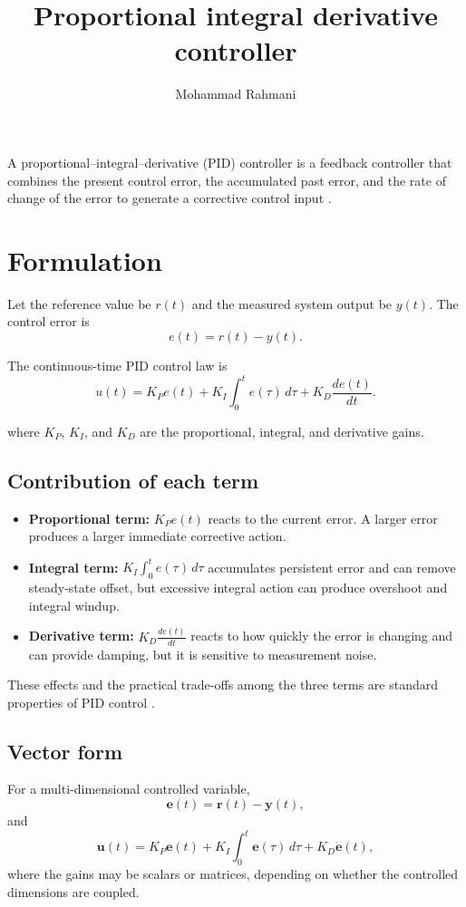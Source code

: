 \documentclass[a4paper]{article}
\title{Proportional integral derivative controller}
\date{}
\author{Mohammad Rahmani}
\begin{document}
   \maketitle

   A proportional--integral--derivative (PID) controller is a feedback controller that combines the present control error, the accumulated past error, and the rate of change of the error to generate a corrective control input \cite{astrom-2008-feedback-systems-an-introduction-for-scientists-and-engineers}.

   \section{Formulation}
      Let the reference value be $r(t)$ and the measured system output be $y(t)$. The control error is
      \[
         e(t)=r(t)-y(t).
      \]

      The continuous-time PID control law is
      \[
         u(t)
         =
         K_P e(t)
         +
         K_I \int_{0}^{t} e(\tau)\,d\tau
         +
         K_D \frac{de(t)}{dt}.
      \]

      where $K_P$, $K_I$, and $K_D$ are the proportional, integral, and derivative gains.

   \subsection{Contribution of each term}
      \begin{itemize}
         \item \textbf{Proportional term:} $K_P e(t)$ reacts to the current error. A larger error produces a larger immediate corrective action.
         \item \textbf{Integral term:} $K_I \int_0^t e(\tau)\,d\tau$ accumulates persistent error and can remove steady-state offset, but excessive integral action can produce overshoot and integral windup.
         \item \textbf{Derivative term:} $K_D \frac{de(t)}{dt}$ reacts to how quickly the error is changing and can provide damping, but it is sensitive to measurement noise.
      \end{itemize}
      These effects and the practical trade-offs among the three terms are standard properties of PID control \cite{astrom-2008-feedback-systems-an-introduction-for-scientists-and-engineers}.

   \subsection{Vector form}
      For a multi-dimensional controlled variable,
      \[
         \mathbf{e}(t)
         =
         \mathbf{r}(t)-\mathbf{y}(t),
      \]
      and
      \[
         \mathbf{u}(t)
         =
         K_P\mathbf{e}(t)
         +
         K_I\int_0^t\mathbf{e}(\tau)\,d\tau
         +
         K_D\dot{\mathbf{e}}(t),
      \]
      where the gains may be scalars or matrices, depending on whether the controlled dimensions are coupled.
\end{document}

